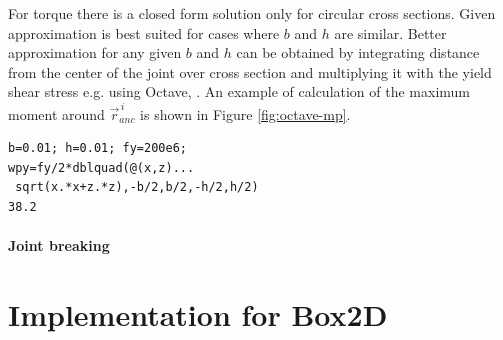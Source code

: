 \documentclass{jcgt}
\begin{document}
\begin {table}
\label{tab:maxForces} 
\end {table}

For torque there is a closed form solution only for
circular cross sections.
Given approximation is 
best suited for cases where $b$ and $h$ are similar.
Better approximation for any given $b$ and $h$ can be obtained 
by integrating distance from the center of the joint over cross section and
multiplying it with the yield shear stress e.g. using Octave, \cite{octave}.
An example of calculation of the maximum moment  around $\vec{r}_{anc}^{\,i} $
is shown in Figure \ref{fig:octave-mp}.

\lstset{language=octave}
\begin{lstlisting}[caption={Calculation of maximum moment  around $\vec{r}_{anc}^{\,i} $ using Octave.}, 
label={lst:octave-mp}, float]
b=0.01; h=0.01; fy=200e6;
wpy=fy/2*dblquad(@(x,z)...
 sqrt(x.*x+z.*z),-b/2,b/2,-h/2,h/2)
38.2
\end{lstlisting}

\paragraph{Joint breaking}


\section{Implementation for Box2D}
\end{document}
